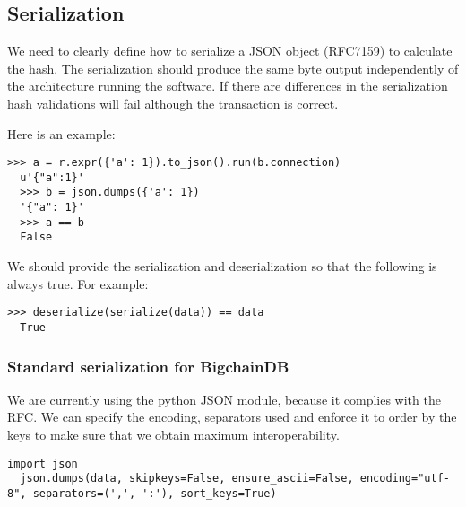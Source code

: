 \subsection{Serialization}
We need to clearly define how to serialize a JSON object (RFC7159) to calculate the hash. 
The serialization should produce the same byte output independently of the architecture running the software.
If there are differences in the serialization hash validations will fail although the transaction is correct.

\medskip
\noindent Here is an example:

\begin{minipage}{\linewidth}
  \begin{lstlisting}[style=python]
  >>> a = r.expr({'a': 1}).to_json().run(b.connection)
  u'{"a":1}'
  >>> b = json.dumps({'a': 1}) 
  '{"a": 1}' 
  >>> a == b 
  False\end{lstlisting}
\end{minipage}

\medskip
\noindent We should provide the serialization and deserialization so that the following is always true.
\medskip
\noindent For example: 

\begin{minipage}{\linewidth}
  \begin{lstlisting}[style=python]
  >>> deserialize(serialize(data)) == data 
  True\end{lstlisting}
\end{minipage}


\subsubsection{Standard serialization for BigchainDB}
We are currently using the python JSON module, because it complies with the RFC.
We can specify the encoding, separators used and enforce it to order by the keys to make sure that we obtain maximum interoperability. 

\begin{minipage}{\linewidth}
  \begin{lstlisting}[style=python]
  import json 
  json.dumps(data, skipkeys=False, ensure_ascii=False, encoding="utf-8", separators=(',', ':'), sort_keys=True)\end{lstlisting}
\end{minipage}

